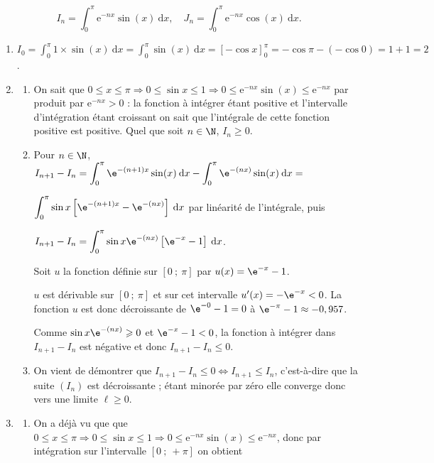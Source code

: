 \medskip



\[I_n = \displaystyle\int_0^{\pi} \text{e}^{- nx}\sin (x)\:\text{d}x, \quad  J_n = \displaystyle\int_0^{\pi} \text{e}^{-nx}\cos (x)\:\text{d}x.\]

\medskip

\begin{enumerate}
\item 
$I_0 = \displaystyle\int_0^{\pi} 1 \times \sin (x)\:\text{d}x = \displaystyle\int_0^{\pi} \sin (x)\:\text{d}x  = [- \cos x]_0^{\pi} = - \cos \pi - (- \cos 0) = 1 + 1 = 2$.
\item 
	\begin{enumerate}
		\item 
On sait que $0 \leqslant x \leqslant  \pi \Rightarrow 0 \leqslant \sin x \leqslant 1 \Rightarrow 0 \leqslant \text{e}^{- nx}\sin (x) \leqslant \text{e}^{- nx}$ par produit par $\text{e}^{- nx} > 0$ : la fonction à intégrer étant positive et l'intervalle d'intégration étant croissant on sait que l'intégrale de cette fonction positive est positive. Quel que soit $n \in \N$,\: $I_n \geqslant 0$.
		\item 
Pour $n \in \N$, \: $I_{n+1} - I_n  = \displaystyle\int_0^{\pi} \e^{-(n+1)x} \sin (x)\:\text{d}x - \displaystyle\int_0^{\pi} \e^{-(nx)} \sin (x)\:\text{d}x = $

$\displaystyle\int_0^{\pi}\sin x\left[\e^{-(n+1)x}  - \e^{-(nx)} \right]\:\text{d}x$ par linéarité de l'intégrale, puis 

$I_{n+1} - I_n  = \displaystyle\int_0^{\pi} \sin x  \e^{-(nx)}\left[\e^{- x} - 1\right]\:\text{d}x$.

Soit $u$ la fonction définie sur $[0~;~\pi]$ par $u(x) = \e^{- x} - 1$.

$u$ est dérivable sur $[0~;~\pi]$ et sur cet intervalle $u'(x) = - \e^{-x} < 0$.
La fonction $u$ est donc décroissante de $\e^{-0} - 1 = 0$ à $\e^{- \pi} - 1 \approx -0,957$.

Comme $\sin x  \e^{-(nx)} \geqslant 0$ et $\e^{- x} - 1 < 0$, la fonction à intégrer dans $I_{n+1} - I_n$ est négative et donc $I_{n+1} - I_n \leqslant 0$.
		\item 

On vient de démontrer que $I_{n+1} - I_n \leqslant 0 \iff I_{n+1} \leqslant I_n $, c'est-à-dire que la suite $\left(I_n\right)$ est décroissante ; étant minorée par zéro elle converge donc vers une limite $\ell \geqslant 0$.
	\end{enumerate}
\item
	\begin{enumerate}
		\item 
On a déjà vu que  que $0 \leqslant x \leqslant \pi \Rightarrow 0 \leqslant \sin x \leqslant 1 \Rightarrow 0 \leqslant \text{e}^{- nx}\sin (x) \leqslant \text{e}^{- nx}$, donc par intégration sur l'intervalle $[0~;~+ \pi]$ on obtient 
		

\end{enumerate}
\end{enumerate}
